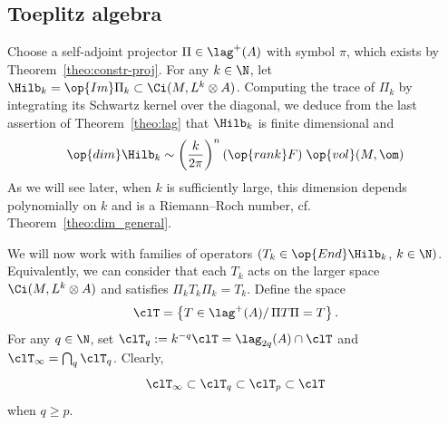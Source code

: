 \subsection{Toeplitz algebra} \label{sec:toeplitz-algebra}

Choose a self-adjoint projector $\Pi \in \lag ^+ (A)$ with symbol $\pi$, which exists by Theorem~\ref{theo:constr-proj}. For any $k\in \N$, let $\Hilb_k = \op{Im} \Pi_k \subset \Ci (M, L^k \otimes A)$. Computing the trace of $\Pi_k$ by integrating its Schwartz kernel over the diagonal, we deduce from the last assertion of Theorem~\ref{theo:lag} that $\Hilb_k$ is finite dimensional and 
\begin{gather}\label{eq:estim_dim}
\op{dim} \Hilb_k \sim \left(\frac{k}{2 \pi} \right)^n (\op{rank} F) \;
\op{vol} (M, \om)
\end{gather}
As we will see later, when $k$ is sufficiently large, this dimension depends polynomially on $k$ and is a Riemann--Roch number, cf. Theorem~\ref{theo:dim_general}. 

We will now work with families of operators $(T_k \in \op{End} \Hilb_k$, $k \in
\N)$. Equivalently, we can consider that each $T_k$ acts on the larger space $\Ci (M, L^k \otimes A)$ and satisfies $\Pi_k T_k \Pi_k = T_k$. Define the space
\begin{gather}\label{eq:Toeplitz_Pi}
\clT = \left\{ T \in \lag^{+} (A) / \, \Pi T \Pi = T \right\}.
\end{gather}
For any $q \in \N$, set $\clT_q := k^{-q} \clT =
\lag_{2q} (A) \cap \clT $ and $\clT_{\infty} = \bigcap_q \clT_q $. Clearly,
\[
\clT_\infty
\subset \clT_q
\subset \clT_p \subset \clT
\]
when $q \geqslant p$.

